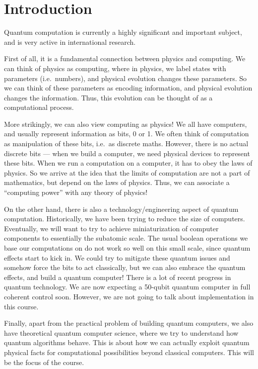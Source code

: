 \setcounter{section}{-1}
\section{Introduction}
Quantum computation is currently a highly significant and important subject, and is very active in international research.

First of all, it is a fundamental connection between physics and computing. We can think of physics as computing, where in physics, we label states with parameters (i.e.\ numbers), and physical evolution changes these parameters. So we can think of these parameters as encoding information, and physical evolution changes the information. Thus, this evolution can be thought of as a computational process.

More strikingly, we can also view computing as physics! We all have computers, and usually represent information as bits, 0 or 1. We often think of computation as manipulation of these bits, i.e.\ as discrete maths. However, there is no actual discrete bits --- when we build a computer, we need physical devices to represent these bits. When we run a computation on a computer, it has to obey the laws of physics. So we arrive at the idea that the limits of computation are not a part of mathematics, but depend on the laws of physics. Thus, we can associate a ``computing power'' with any theory of physics!

On the other hand, there is also a technology/engineering aspect of quantum computation. Historically, we have been trying to reduce the size of computers. Eventually, we will want to try to achieve miniaturization of computer components to essentially the subatomic scale. The usual boolean operations we base our computations on do not work so well on this small scale, since quantum effects start to kick in. We could try to mitigate these quantum issues and somehow force the bits to act classically, but we can also embrace the quantum effects, and build a quantum computer! There is a lot of recent progress in quantum technology. We are now expecting a 50-qubit quantum computer in full coherent control soon. However, we are not going to talk about implementation in this course.

Finally, apart from the practical problem of building quantum computers, we also have theoretical quantum computer science, where we try to understand how quantum algorithms behave. This is about how we can actually exploit quantum physical facts for computational possibilities beyond classical computers. This will be the focus of the course.

